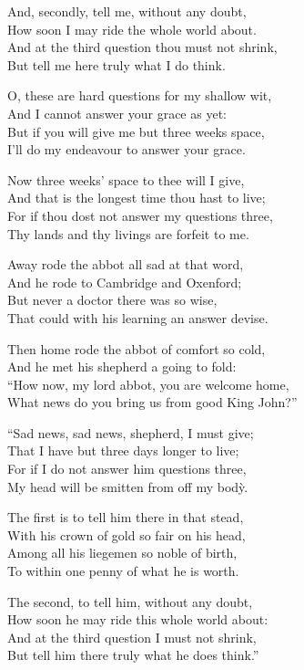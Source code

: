 \begin{dcverse}
And, secondly, tell me, without any doubt,\\
How soon I may ride the whole world about.\\
And at the third question thou must not shrink,\\
But tell me here truly what I do think.

O, these are hard questions for my shallow wit,\\
And I cannot answer your grace as yet:\\
But if you will give me but three weeks space,\\
I’ll do my endeavour to answer your grace.

Now three weeks’ space to thee will I give,\\
And that is the longest time thou hast to live;\\
For if thou dost not answer my questions three,\\
Thy lands and thy livings are forfeit to me.

Away rode the abbot all sad at that word,\\
And he rode to Cambridge and Oxenford;\\
But never a doctor there was so wise,\\
That could with his learning an answer devise.

Then home rode the abbot of comfort so cold,\\
And he met his shepherd a going to fold:\\
“How now, my lord abbot, you are welcome home, \\
What news do you bring us from good King John?”

“Sad news, sad news, shepherd, I must give;\\
That I have but three days longer to live;\\
For if I do not answer him questions three,\\
My head will be smitten from off my bodỳ.

The first is to tell him there in that stead,\\
With his crown of gold so fair on his head,\\
Among all his liegemen so noble of birth,\\
To within one penny of what he is worth.

The second, to tell him, without any doubt,\\
How soon he may ride this whole world about:\\
And at the third question I must not shrink,\\
But tell him there truly what he does think.”


\end{dcverse}
